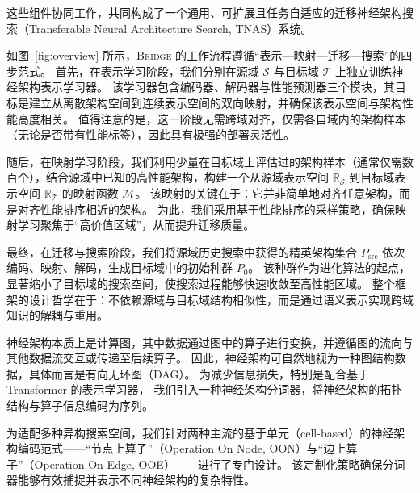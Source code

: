 \documentclass[../main.tex]{subfiles}
\begin{document}
这些组件协同工作，共同构成了一个通用、可扩展且任务自适应的迁移神经架构搜索（Transferable Neural Architecture Search, TNAS）系统。

如图~\ref{fig:overview} 所示，\textsc{Bridge} 的工作流程遵循“表示—映射—迁移—搜索”的四步范式。
首先，在表示学习阶段，我们分别在源域 $\mathcal{S}$ 与目标域 $\mathcal{T}$ 上独立训练神经架构表示学习器。
该学习器包含编码器、解码器与性能预测器三个模块，其目标是建立从离散架构空间到连续表示空间的双向映射，并确保该表示空间与架构性能高度相关。
值得注意的是，这一阶段无需跨域对齐，仅需各自域内的架构样本（无论是否带有性能标签），因此具有极强的部署灵活性。

随后，在映射学习阶段，我们利用少量在目标域上评估过的架构样本（通常仅需数百个），结合源域中已知的高性能架构，构建一个从源域表示空间 $\mathbb{R}_{\mathcal{S}}$ 到目标域表示空间 $\mathbb{R}_{\mathcal{T}}$ 的映射函数 $\mathcal{M}$。
该映射的关键在于：它并非简单地对齐任意架构，而是对齐性能排序相近的架构。
为此，我们采用基于性能排序的采样策略，确保映射学习聚焦于“高价值区域”，从而提升迁移质量。

最终，在迁移与搜索阶段，我们将源域历史搜索中获得的精英架构集合 $P_{\mathrm{src}}$ 依次编码、映射、解码，生成目标域中的初始种群 $P_0$。
该种群作为进化算法的起点，显著缩小了目标域的搜索空间，使搜索过程能够快速收敛至高性能区域。
整个框架的设计哲学在于：不依赖源域与目标域结构相似性，而是通过语义表示实现跨域知识的解耦与重用。

\label{sec:ch4_arch-encoding-and-representation-learning}


神经架构本质上是计算图，其中数据通过图中的算子进行变换，并遵循图的流向与其他数据流交互或传递至后续算子。
因此，神经架构可自然地视为一种图结构数据，具体而言是有向无环图（DAG）。
为减少信息损失，特别是配合基于 Transformer 的表示学习器，
我们引入一种神经架构分词器，将神经架构的拓扑结构与算子信息编码为序列。

为适配多种异构搜索空间，我们针对两种主流的基于单元（cell-based）的神经架构编码范式——“节点上算子”（Operation On Node, OON）与“边上算子”（Operation On Edge, OOE）——进行了专门设计。
该定制化策略确保分词器能够有效捕捉并表示不同神经架构的复杂特性。
\end{document}

